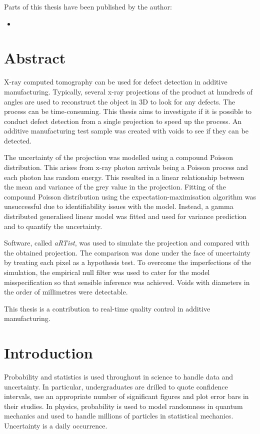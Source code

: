 \documentclass[12pt, a4paper, oneside]{memoir}
\begin{document}
Parts of this thesis have been published by the author:
\begin{itemize}
  \item\nobibliography*{}
\end{itemize}

\chapter{Abstract}
X-ray computed tomography can be used for defect detection in additive manufacturing. Typically, several x-ray projections of the product at hundreds of angles are used to reconstruct the object in 3D to look for any defects. The process can be time-consuming. This thesis aims to investigate if it is possible to conduct defect detection from a single projection to speed up the process. An additive manufacturing test sample was created with voids to see if they can be detected.

The uncertainty of the projection was modelled using a compound Poisson distribution. This arises from x-ray photon arrivals being a Poisson process and each photon has random energy. This resulted in a linear relationship between the mean and variance of the grey value in the projection. Fitting of the compound Poisson distribution using the expectation-maximisation algorithm was unsuccessful due to identifiability issues with the model. Instead, a gamma distributed generalised linear model was fitted and used for variance prediction and to quantify the uncertainty.

Software, called \emph{aRTist}, was used to simulate the projection and compared with the obtained projection. The comparison was done under the face of uncertainty by treating each pixel as a hypothesis test. To overcome the imperfections of the simulation, the empirical null filter was used to cater for the model misspecification so that sensible inference was achieved. Voids with diameters in the order of millimetres were detectable.

This thesis is a contribution to real-time quality control in additive manufacturing.

\newpage

\mainmatter

\chapter{Introduction}

Probability and statistics is used throughout in science to handle data and uncertainty. In particular, undergraduates are drilled to quote confidence intervals, use an appropriate number of significant figures and plot error bars in their studies. In physics, probability is used to model randomness in quantum mechanics and used to handle millions of particles in statistical mechanics. Uncertainty is a daily occurrence.
\end{document}
